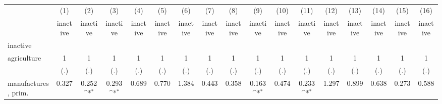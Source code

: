 {
\def\sym#1{\ifmmode^{#1}\else\(^{#1}\)\fi}
\begin{tabular}{l*{16}{c}}
\hline\hline
                    &\multicolumn{1}{c}{(1)}&\multicolumn{1}{c}{(2)}&\multicolumn{1}{c}{(3)}&\multicolumn{1}{c}{(4)}&\multicolumn{1}{c}{(5)}&\multicolumn{1}{c}{(6)}&\multicolumn{1}{c}{(7)}&\multicolumn{1}{c}{(8)}&\multicolumn{1}{c}{(9)}&\multicolumn{1}{c}{(10)}&\multicolumn{1}{c}{(11)}&\multicolumn{1}{c}{(12)}&\multicolumn{1}{c}{(13)}&\multicolumn{1}{c}{(14)}&\multicolumn{1}{c}{(15)}&\multicolumn{1}{c}{(16)}\\
                    &\multicolumn{1}{c}{inactive}&\multicolumn{1}{c}{inactive}&\multicolumn{1}{c}{inactive}&\multicolumn{1}{c}{inactive}&\multicolumn{1}{c}{inactive}&\multicolumn{1}{c}{inactive}&\multicolumn{1}{c}{inactive}&\multicolumn{1}{c}{inactive}&\multicolumn{1}{c}{inactive}&\multicolumn{1}{c}{inactive}&\multicolumn{1}{c}{inactive}&\multicolumn{1}{c}{inactive}&\multicolumn{1}{c}{inactive}&\multicolumn{1}{c}{inactive}&\multicolumn{1}{c}{inactive}&\multicolumn{1}{c}{inactive}\\
\hline
inactive            &                     &                     &                     &                     &                     &                     &                     &                     &                     &                     &                     &                     &                     &                     &                     &                     \\
agriculture         &           1         &           1         &           1         &           1         &           1         &           1         &           1         &           1         &           1         &           1         &           1         &           1         &           1         &           1         &           1         &           1         \\
                    &         (.)         &         (.)         &         (.)         &         (.)         &         (.)         &         (.)         &         (.)         &         (.)         &         (.)         &         (.)         &         (.)         &         (.)         &         (.)         &         (.)         &         (.)         &         (.)         \\
[1em]
manufactures, prim. &       0.327         &       0.252\sym{*}  &       0.293\sym{*}  &       0.689         &       0.770         &       1.384         &       0.443         &       0.358         &       0.163\sym{*}  &       0.474         &       0.233\sym{*}  &       1.297         &       0.899         &       0.638         &       0.273         &       0.588         \\

\end{tabular}}
